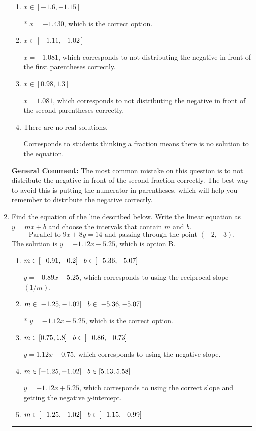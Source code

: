 \documentclass{extbook}[14pt]
\newcommand{\litem}[1]{\item #1

\rule{\textwidth}{0.4pt}}
\begin{document}
\begin{enumerate}
{\begin{enumerate}[label=\Alph*.]
$x = -0.989$, which corresponds to getting the negative of the actual solution.
\item \( x \in [-1.6, -1.15] \)

* $x = -1.430$, which is the correct option.
\item \( x \in [-1.11, -1.02] \)

$x = -1.081$, which corresponds to not distributing the negative in front of the first parentheses correctly.
\item \( x \in [0.98, 1.3] \)

$x = 1.081$, which corresponds to not distributing the negative in front of the second parentheses correctly.
\item \( \text{There are no real solutions.} \)

Corresponds to students thinking a fraction means there is no solution to the equation.
\end{enumerate}

\textbf{General Comment:} The most common mistake on this question is to not distribute the negative in front of the second fraction correctly. The best way to avoid this is putting the numerator in parentheses, which will help you remember to distribute the negative correctly.
}
\litem{
Find the equation of the line described below. Write the linear equation as $ y=mx+b $ and choose the intervals that contain $m$ and $b$.
\[ \text{Parallel to } 9 x + 8 y = 14 \text{ and passing through the point } (-2, -3). \]The solution is \( y = -1.12x - 5.25 \), which is option B.\begin{enumerate}[label=\Alph*.]
\item \( m \in [-0.91, -0.2] \hspace*{3mm} b \in [-5.36, -5.07] \)

 $y = -0.89x - 5.25$, which corresponds to using the reciprocal slope $(1/m)$.
\item \( m \in [-1.25, -1.02] \hspace*{3mm} b \in [-5.36, -5.07] \)

* $y = -1.12x - 5.25$, which is the correct option.
\item \( m \in [0.75, 1.8] \hspace*{3mm} b \in [-0.86, -0.73] \)

 $y = 1.12x - 0.75$, which corresponds to using the negative slope.
\item \( m \in [-1.25, -1.02] \hspace*{3mm} b \in [5.13, 5.58] \)

 $y = -1.12x + 5.25$, which corresponds to using the correct slope and getting the negative $y$-intercept.
\item \( m \in [-1.25, -1.02] \hspace*{3mm} b \in [-1.15, -0.99] \)


\end{enumerate}}
\end{enumerate}
\end{document}
